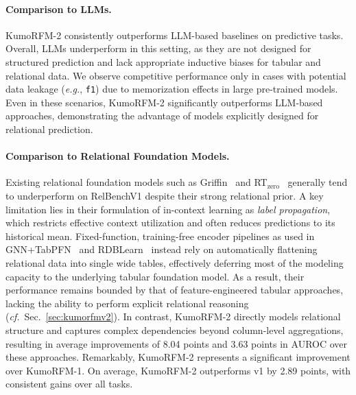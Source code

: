 \documentclass{article}
\newcommand{\onezero}{1\xspace}
\newcommand{\twozero}{2\xspace}
\newcommand{\name}{KumoRFM\xspace}
\newcommand{\nameone}{\name-\onezero}
\newcommand{\nametwo}{\name-\twozero}
\begin{document}
\paragraph{Comparison to LLMs.}

\nametwo consistently outperforms LLM-based baselines on predictive tasks.
Overall, LLMs underperform in this setting, as they are not designed for structured prediction and lack appropriate inductive biases for tabular and relational data.
We observe competitive performance only in cases with potential data leakage (\emph{e.g.}, \texttt{f1}) due to memorization effects in large pre-trained models.
Even in these scenarios, \nametwo significantly outperforms LLM-based approaches, demonstrating the advantage of models explicitly designed for relational prediction.

\paragraph{Comparison to Relational Foundation Models.}

Existing relational foundation models such as Griffin~\citep{griffin} and RT$_{\textrm{zero}}$~\citep{ranjan2026rt} generally tend to underperform on RelBenchV1 despite their strong relational prior.
A key limitation lies in their formulation of in-context learning as \emph{label propagation}, which restricts effective context utilization and often reduces predictions to its historical mean.
Fixed-function, training-free encoder pipelines as used in GNN+TabPFN~\citep{gnntabpfn} and RDBLearn~\citep{xu2026rdblearn} instead rely on automatically flattening relational data into single wide tables, effectively deferring most of the modeling capacity to the underlying tabular foundation model.
As a result, their performance remains bounded by that of feature-engineered tabular approaches, lacking the ability to perform explicit relational reasoning (\emph{cf.}~Sec.~\ref{sec:kumorfmv2}).
In contrast, \nametwo directly models relational structure and captures complex dependencies beyond column-level aggregations, resulting in average improvements of 8.04 points and 3.63 points in AUROC over these approaches.
Remarkably, \nametwo represents a significant improvement over \nameone.
On average, \nametwo outperforms v\onezero by 2.89 points, with consistent gains over all tasks.
\end{document}
